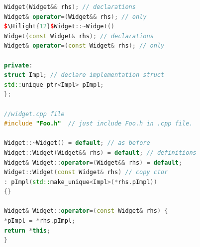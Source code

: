 \documentclass[a4paper,12pt,twoside]{book}
\newcommand{\Hilight}[1]{\makebox[0pt][l]{\color{yellow}\rule[-3pt]{#1em}{11pt}}}
\begin{document}
\begin{itemize}
\begin{enumerate}
\begin{lstlisting}[frame=single, language=c++, mathescape=true]
Widget(Widget&& rhs); // declarations
Widget& operator=(Widget&& rhs); // only
$\Hilight{12}$Widget::~Widget()
Widget(const Widget& rhs); // declarations
Widget& operator=(const Widget& rhs); // only

private:
struct Impl; // declare implementation struct
std::unique_ptr<Impl> pImpl;
};

//widget.cpp file
#include "Foo.h"  // just include Foo.h in .cpp file.

Widget::~Widget() = default; // as before
Widget::Widget(Widget&& rhs) = default; // definitions
Widget& Widget::operator=(Widget&& rhs) = default;
Widget::Widget(const Widget& rhs) // copy ctor
: pImpl(std::make_unique<Impl>(*rhs.pImpl))
{}

Widget& Widget::operator=(const Widget& rhs) {
*pImpl = *rhs.pImpl;
return *this;
}
\end{lstlisting}

\end{enumerate}

\end{itemize}
\end{document}
